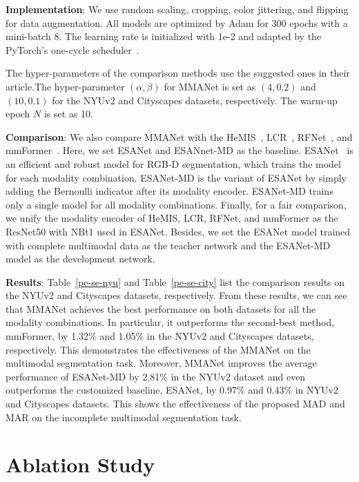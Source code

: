 \documentclass[10pt,twocolumn,letterpaper]{article}
\begin{document}
\textbf{Implementation}: We use random scaling, cropping, color jittering, and flipping for data augmentation. All models are optimized by Adam for 300 epochs with a mini-batch 8. The learning rate is initialized with 1e-2 and adapted by the PyTorch’s one-cycle scheduler~\cite{onecycle}. 



The hyper-parameters of the comparison methods use the suggested ones in their article.The hyper-parameter $(\alpha,\beta)$ for MMANet is set as $(4,0.2)$ and $(10,0.1)$ for the NYUv2 and Cityscapes datasets, respectively. The warm-up epoch $N$ is set as 10.




\textbf{Comparison}: We also compare MMANet with the HeMIS~\cite{hemis}, LCR~\cite{lcr}, RFNet~\cite{rfnet}, and mmFormer~\cite{mmformer}. Here, we set ESANet and ESANnet-MD as the baseline. ESANet~\cite{ESANet} is an efficient and robust model for RGB-D segmentation, which trains the model for each modality combination. ESANet-MD is the variant of ESANet by simply adding the Bernoulli indicator after its modality encoder. ESANet-MD trains only a single model for all modality combinations. Finally, for a fair comparison, we unify the modality encoder of HeMIS, LCR, RFNet, and mmFormer as the ResNet50 with NBt1 used in ESANet. Besides, we set the ESANet model trained with complete multimodal data as the teacher network and the ESANet-MD model as the development network.


\textbf{Results}: Table~\ref{pe-se-nyu} and Table~\ref{pe-se-city} list the comparison results on the NYUv2 and Cityscapes datasets, respectively. From these results, we can see that MMANet achieves the best performance on both datasets for all the modality combinations. In particular, it outperforms the second-best method, mmFormer, by 1.32\% and 1.05\% in the NYUv2 and Cityscapes datasets, respectively. This demonstrates the effectiveness of the MMANet on the multimodal segmentation task. Moreover, MMANet improves the average performance of ESANet-MD by 2.81\% in the NYUv2 dataset and even outperforms the customized baseline, ESANet, by 0.97\% and 0.43\% in NYUv2 and Cityscapes datasets. This shows the effectiveness of the proposed MAD and MAR on the incomplete multimodal segmentation task.







\section{Ablation Study}
\end{document}
